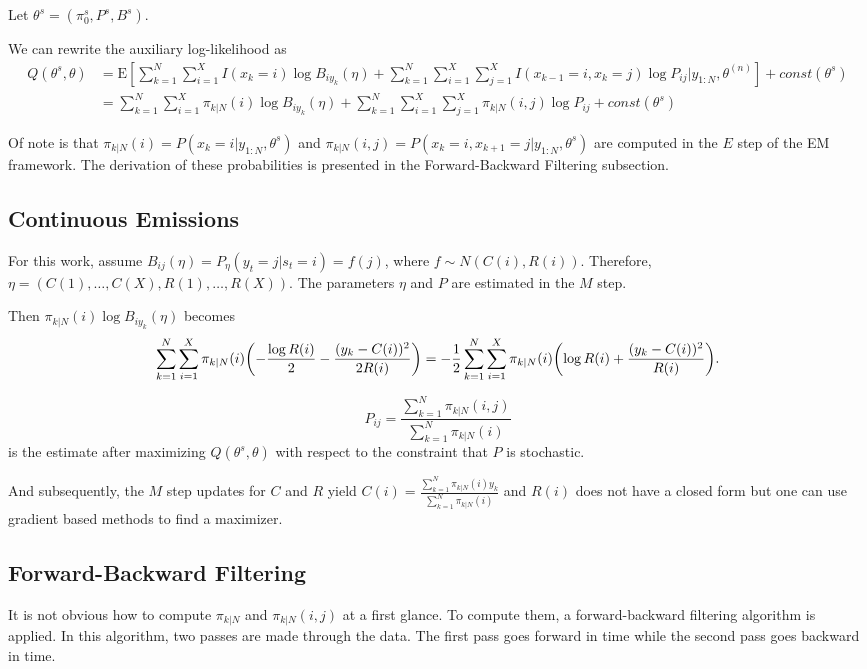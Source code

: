 \documentclass[english]{article}
\numberwithin{equation}{section}
\newcommand{\E}{\mathrm{E}}
\DeclarePairedDelimiter\paren{(}{)}           %
\begin{document}
	Let $\theta^s = (\pi_0^s,P^s,B^s)$. 
	
	We can rewrite the auxiliary log-likelihood as
	\begin{align*}
	Q(\theta^{s},\theta) &= \E\left[ \sum_{k=1}^N \sum_{i=1}^X I(x_k=i) \log B_{iy_k}(\eta) + \sum_{k=1}^N \sum_{i=1}^X \sum_{j=1}^X I(x_{k-1}=i,x_k=j) \log P_{ij} | y_{1:N},\theta^{(n)}\right] + const(\theta^{s}) \\
	&= \sum_{k=1}^N \sum_{i=1}^X \pi_{k|N}(i)\log B_{iy_k}(\eta) + \sum_{k=1}^N \sum_{i=1}^X \sum_{j=1}^X \pi_{k|N}(i,j)\log P_{ij} + const(\theta^s)
	\end{align*}
	
	Of note is that $\pi_{k|N}(i)=P(x_k=i|y_{1:N},\theta^s)$ and $\pi_{k|N}(i,j)=P(x_k=i,x_{k+1}=j|y_{1:N},\theta^s)$ are computed in the $E$ step of the EM framework. The derivation of these probabilities is presented in the Forward-Backward Filtering subsection.
	
	\subsection*{Continuous Emissions}
	
	For this work, assume $B_{ij}(\eta) = P_{\eta}(y_t=j|s_t=i) = f(j)$, where $f\sim N(C(i),R(i))$. Therefore, $\eta=(C(1),\ldots,C(X),R(1),\ldots,R(X))$. The parameters $\eta$ and $P$ are estimated in the $M$ step.
	
	Then $\pi_{k|N}(i)\log B_{iy_k}(\eta)$ becomes
	$$
	\sum_{k=1}^N \sum_{i=1}^X \pi_{k|N}(i)\paren*{-\frac{\log R(i)}{2}-\frac{(y_k-C(i))^2}{2R(i)}}=-\frac{1}{2}\sum_{k=1}^N \sum_{i=1}^X \pi_{k|N}(i)\paren*{\log R(i)+\frac{(y_k-C(i))^2}{R(i)}}.
	$$
		
	$$P_{ij}=\frac{\sum_{k=1}^N \pi_{k|N}(i,j)}{\sum_{k=1}^N \pi_{k|N}(i)}$$ is the estimate after maximizing $Q(\theta^{s},\theta)$ with respect to the constraint that $P$ is stochastic.
	
	And subsequently, the $M$ step updates for $C$ and $R$ yield
	$C(i) = \frac{\sum_{k=1}^N \pi_{k|N}(i)y_k}{\sum_{k=1}^N \pi_{k|N}(i)}$ and $R(i)$ does not have a closed form but one can use gradient based methods to find a maximizer.
	
	\subsection*{Forward-Backward Filtering}
	
	It is not obvious how to compute $\pi_{k|N}$ and $\pi_{k|N}(i,j)$ at a first glance. To compute them, a forward-backward filtering algorithm is applied. In this algorithm, two passes are made through the data. The first pass goes forward in time while the second pass goes backward in time.
	
\end{document}

